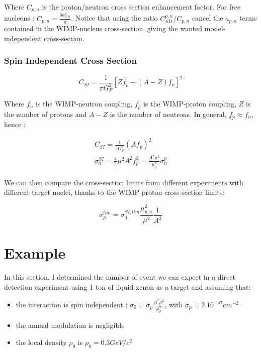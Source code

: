 \documentclass[a4paper, twoside, openany, 11pt]{book}
\begin{document}
Where $C_{p,n}$ is the proton/neutron cross section enhancement factor. For free nucleons : $C_{p,n} = \frac{6a_{p,n}^2}{\pi}$. Notice that using the ratio $ C_{SD}^{p,n}/C_{p,n} $ cancel the $a_{p,n}$ terms contained in the WIMP-nucleus cross-section, giving the wanted model-independent cross-section. 


\subsubsection*{Spin Independent Cross Section}

\begin{equation}
  C_{SI} = \frac{1}{\pi G_F^2} \left[Zf_p + (A-Z)f_n \right]^2
 \end{equation}
 
 Where $f_n$ is the WIMP-neutron coupling,  $f_p$ is the WIMP-proton coupling, $Z$ is the number of protons and $A-Z$ is the number of neutrons. 
 In general, $f_p \approx f_n$, hence :
 
 \begin{align}
  C_{SI} = \frac{1}{\pi G_F^2} (Af_p)^2 \\
 \sigma_0^{SI} = \frac{4}{\pi} \mu^2 A^2 f_p^2 = \frac{A^2 \mu^2}{\mu_p^2} \sigma_0^p
 \end{align}

We can then compare the cross-section limits from different experiments with different target nuclei, thanks to the WIMP-proton cross-section limits: 

\begin{equation}
\sigma_p^{lim}= \sigma_0^{SI,lim} \frac{\mu_{p,n}^2}{\mu^2} \frac{1}{A^2}
\end{equation}


\section{Example}

In this section, I determined the number of event we can expect in a direct detection experiment using 1 ton of liquid xenon as a target and assuming that: 
\begin{itemize}
\item the interaction is spin independent : $\sigma_0 = \sigma_p \frac{A^2 \mu^2}{\mu_p^2}$, with $\sigma_p=2.10^{-47} cm^{-2}$
\item the annual modulation is negligible 
\item the local density $\rho_0$ is  $\rho_0=0.3 GeV/c^2$
\end{itemize}
\end{document}
